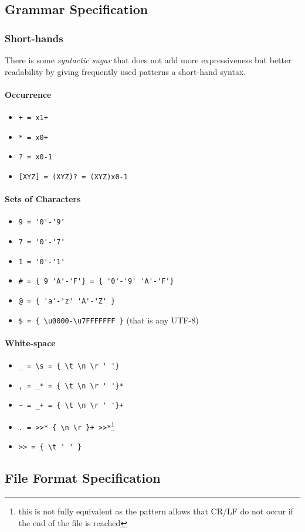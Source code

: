 \documentclass[10pt,a4paper]{article}
\begin{document}
\subsection{Grammar Specification}

\subsubsection{Short-hands}
There is some \textit{syntactic sugar} that does not add more expressiveness but better readability by giving frequently used patterns a short-hand syntax.

\paragraph*{Occurrence}
\begin{itemize}
\item \verb!+ = x1+!
\item \verb!* = x0+!
\item \verb!? = x0-1!
\item \verb![XYZ] = (XYZ)? = (XYZ)x0-1!
\end{itemize}

\paragraph*{Sets of Characters}
\begin{itemize}
\item \verb!9 = '0'-'9'!
\item \verb!7 = '0'-'7'!
\item \verb!1 = '0'-'1'!
\item \verb!# = { 9 'A'-'F'} = { '0'-'9' 'A'-'F'}!
\item \verb!@ = { 'a'-'z' 'A'-'Z' }!
\item \verb!$ = { \u0000-\u7FFFFFFF }! (that is any UTF-8)
\end{itemize}

\paragraph*{White-space}
\begin{itemize}
\item \verb$_ = \s = { \t \n \r ' '}$
\item \verb$, = _* = { \t \n \r ' '}*$
\item \verb$~ = _+ = { \t \n \r ' '}+$
\item \verb$. = >>* { \n \r }+ >>*$\footnote{this is not fully equivalent as the pattern allows that CR/LF do not occur if the end of the file is reached}
\item \verb$>> = { \t ' ' }$
\end{itemize}

\newpage


\subsection{File Format Specification}
\end{document}
